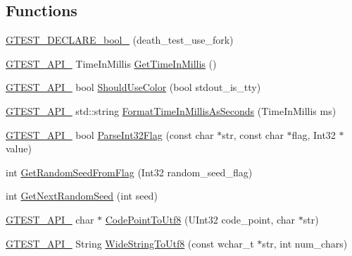 \subsection*{\-Functions}
\begin{DoxyCompactItemize}
\item 
\hyperlink{namespacetesting_ad18df0380e9015a496c410c30e66b0e1}{\-G\-T\-E\-S\-T\-\_\-\-D\-E\-C\-L\-A\-R\-E\-\_\-bool\-\_\-} (death\-\_\-test\-\_\-use\-\_\-fork)
\item 
\hyperlink{gtest-port_8h_aa73be6f0ba4a7456180a94904ce17790}{\-G\-T\-E\-S\-T\-\_\-\-A\-P\-I\-\_\-} \-Time\-In\-Millis \hyperlink{namespacetesting_1_1internal_ae0c6fd4543c65945515c42d6f43cc138}{\-Get\-Time\-In\-Millis} ()
\item 
\hyperlink{gtest-port_8h_aa73be6f0ba4a7456180a94904ce17790}{\-G\-T\-E\-S\-T\-\_\-\-A\-P\-I\-\_\-} bool \hyperlink{namespacetesting_1_1internal_ab0f928e61ab8ec92e75ddfcae9324c1e}{\-Should\-Use\-Color} (bool stdout\-\_\-is\-\_\-tty)
\item 
\hyperlink{gtest-port_8h_aa73be6f0ba4a7456180a94904ce17790}{\-G\-T\-E\-S\-T\-\_\-\-A\-P\-I\-\_\-} std\-::string \hyperlink{namespacetesting_1_1internal_a5802d68a85d566a0c82a0df5fd2aa58b}{\-Format\-Time\-In\-Millis\-As\-Seconds} (\-Time\-In\-Millis ms)
\item 
\hyperlink{gtest-port_8h_aa73be6f0ba4a7456180a94904ce17790}{\-G\-T\-E\-S\-T\-\_\-\-A\-P\-I\-\_\-} bool \hyperlink{namespacetesting_1_1internal_a082f2d6b59adc025b035b2c51b0fc47e}{\-Parse\-Int32\-Flag} (const char $\ast$str, const char $\ast$flag, \-Int32 $\ast$value)
\item 
int \hyperlink{namespacetesting_1_1internal_a968b1b4479cfbc49079f9a06fe37d5ba}{\-Get\-Random\-Seed\-From\-Flag} (\-Int32 random\-\_\-seed\-\_\-flag)
\item 
int \hyperlink{namespacetesting_1_1internal_ae2fa5c0c84f0feabbd41ebc1dc208c84}{\-Get\-Next\-Random\-Seed} (int seed)
\item 
\hyperlink{gtest-port_8h_aa73be6f0ba4a7456180a94904ce17790}{\-G\-T\-E\-S\-T\-\_\-\-A\-P\-I\-\_\-} char $\ast$ \hyperlink{namespacetesting_1_1internal_ae994812b6d35cea374d4f9754afc1659}{\-Code\-Point\-To\-Utf8} (\-U\-Int32 code\-\_\-point, char $\ast$str)
\item 
\hyperlink{gtest-port_8h_aa73be6f0ba4a7456180a94904ce17790}{\-G\-T\-E\-S\-T\-\_\-\-A\-P\-I\-\_\-} \-String \hyperlink{namespacetesting_1_1internal_a1a297845a586bbc4f853032571736af2}{\-Wide\-String\-To\-Utf8} (const wchar\-\_\-t $\ast$str, int num\-\_\-chars)
\item 

\end{DoxyCompactItemize}
